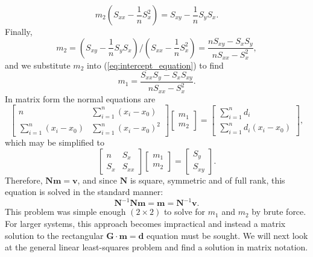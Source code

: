 \begin{equation}
m_2 \left ( S_{xx} - \frac{1}{n} S_x^2 \right ) = S_{xy} - \frac{1}{n} S_y S_x.
\end{equation}	 
Finally,
\begin{equation}
m_2 = \left ( S_{xy} - \frac{1}{n} S_y  S_x \right ) / \left ( S_{xx} - \frac{1}{n} S_x^2 \right )  =\frac{n S_{xy} - S_x  S_y}{n S_{xx} - S_x^2},
\label{eq:slope_solution}
\end{equation}	 
and we substitute $m_2$ into (\ref{eq:intercept_equation}) to find
\begin{equation}
m_1 = \frac{S_{xx} S_y - S_x  S_{xy}}{n S_{xx} - S_x^2}.
\label{eq:intercept_solution}
\end{equation}	 
In matrix form the normal equations are
\begin{equation}
\left [
\begin{array}{cc}
n & \displaystyle \sum^n_{i=1}(x_i - x_0)\\
\displaystyle \sum^n_{i=1}(x_i - x_0) & \displaystyle \sum^n_{i=1}(x_i - x_0)^2
\end{array} \right ]
\left [
\begin{array}{c}
m_1\\ m_2
\end{array} \right ] =
\left[
\begin{array}{c}
\displaystyle \sum^n_{i=1}d_i\\
\displaystyle \sum^n_{i=1}d_i(x_i - x_0)
\end{array}
\right ],
\end{equation}
which may be simplified to
\begin{equation}
\left [
\begin{array}{cc}
n & S_x \\
S_x & S_{xx}
\end{array} \right ]
\left [
\begin{array}{c}
m_1\\ m_2
\end{array} \right ] =
\left[
\begin{array}{c}
S_y\\
S_{xy}
\end{array}
\right ] .
\end{equation}
Therefore, $\mathbf{Nm = v}$, and since $\mathbf{N}$ is square, symmetric and of full rank, this equation is solved in 
the standard manner:
\begin{equation}
\mathbf{N}^{-1} \mathbf{Nm = m = N}^{-1} \mathbf{v}.
\end{equation}	 
This problem was simple enough $(2 \times 2)$ to solve for $m_1$ and $m_2$ by brute force. For larger systems,
this approach becomes impractical and instead a matrix solution to the rectangular $\mathbf{G\cdot m = d}$ equation must be 
sought. We will next look at the general linear least-squares problem and find a solution in 
matrix notation.

